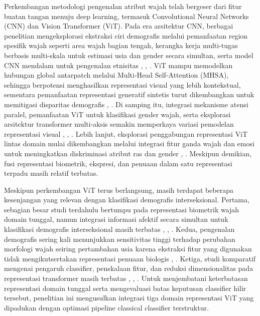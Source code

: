 Perkembangan metodologi pengenalan atribut wajah telah bergeser dari fitur buatan tangan menuju deep learning, termasuk Convolutional Neural Networks (CNN) dan Vision Transformer (ViT). Pada era arsitektur CNN, berbagai penelitian mengeksplorasi ekstraksi ciri demografis melalui pemanfaatan region spesifik wajah seperti area wajah bagian tengah, kerangka kerja multi-tugas berbasis multi-skala untuk estimasi usia dan gender secara simultan, serta model CNN mendalam untuk pengenalan etnisitas \cite{ref11}, \cite{ref12}, \cite{ref13}. ViT mampu memodelkan hubungan global antarpatch melalui Multi-Head Self-Attention (MHSA), sehingga berpotensi menghasilkan representasi visual yang lebih kontekstual, sementara pemanfaatan representasi generatif sintetis turut dikembangkan untuk memitigasi disparitas demografis \cite{ref14}, \cite{ref15}. Di samping itu, integrasi mekanisme atensi paralel, pemanfaatan ViT untuk klasifikasi gender wajah, serta eksplorasi arsitektur transformer multi-aksis semakin memperkaya variasi pemodelan representasi visual \cite{ref16}, \cite{ref17}, \cite{ref18}. Lebih lanjut, eksplorasi penggabungan representasi ViT lintas domain mulai dikembangkan melalui integrasi fitur ganda wajah dan emosi untuk meningkatkan diskriminasi atribut ras dan gender \cite{ref19}, \cite{ref20}. Meskipun demikian, fusi representasi biometrik, ekspresi, dan penuaan dalam satu representasi terpadu masih relatif terbatas.

Meskipun perkembangan ViT terus berlangsung, masih terdapat beberapa kesenjangan yang relevan dengan klasifikasi demografis interseksional. Pertama, sebagian besar studi terdahulu bertumpu pada representasi biometrik wajah domain tunggal, namun integrasi informasi afektif secara simultan untuk klasifikasi demografis interseksional masih terbatas \cite{ref11}, \cite{ref17}, \cite{ref18}. Kedua, pengenalan demografis sering kali menunjukkan sensitivitas tinggi terhadap perubahan morfologi wajah seiring pertambahan usia karena ekstraksi fitur yang digunakan tidak mengikutsertakan representasi penuaan biologis \cite{ref12}, \cite{ref17}. Ketiga, studi komparatif mengenai pengaruh classifier, penskalaan fitur, dan reduksi dimensionalitas pada representasi transformer masih terbatas \cite{ref13}, \cite{ref19}, \cite{ref20}. Untuk menjembatani keterbatasan representasi domain tunggal serta mengevaluasi batas keputusan classifier hilir tersebut, penelitian ini mengusulkan integrasi tiga domain representasi ViT yang dipadukan dengan optimasi pipeline classical classifier terstruktur.

